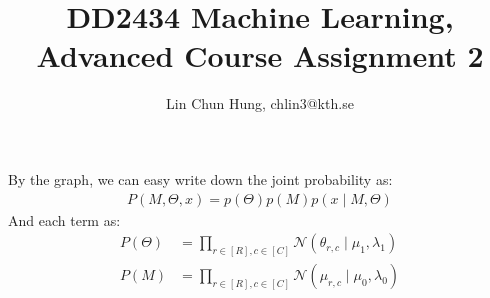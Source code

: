 \documentclass[12pt]{article}
\newenvironment{problem}[2][Problem]{\begin{trivlist}
\item[\hskip \labelsep {\bfseries #1}\hskip \labelsep {\bfseries #2.}]}{\end{trivlist}}
\begin{document}
 
 
\title{DD2434 Machine Learning, Advanced Course Assignment 2}
\author{Lin Chun Hung, chlin3@kth.se}
\maketitle

\begin{problem}{2.9.25}
By the graph, we can easy write down the joint probability as:
    \begin{align*}
        P(M, \Theta, x) = p(\Theta)p(M)p(x \mid M, \Theta)
    \end{align*}
And each term as:
\begin{align*}
    P(\Theta) &= \prod_{r \in [R], c\in [C]} \mathcal{N}(\theta_{r,c}\mid \mu_{1}, \lambda_{1}) \\
    P(M) &= \prod_{r \in [R], c\in [C]} \mathcal{N}(\mu_{r,c}\mid \mu_{0}, \lambda_{0})
\end{align*}
\end{problem}


\end{document}
